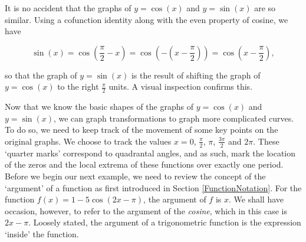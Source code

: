 \medskip

It is no accident that the graphs of $y = \cos(x)$ and $y = \sin(x)$ are so similar.  Using a cofunction identity along with the even property of cosine, we have

\[ \sin(x) = \cos\left(\frac{\pi}{2} - x\right) = \cos\left(-\left(x - \frac{\pi}{2}\right)\right) = \cos\left(x - \frac{\pi}{2}\right),\]

so that the graph of $y=\sin(x)$ is the result of shifting the graph of $y = \cos(x)$ to the right $\frac{\pi}{2}$ units.  A visual inspection confirms this. 

\smallskip

Now that we know the basic shapes of the graphs of $y = \cos(x)$ and $y = \sin(x)$, we can graph transformations to graph more complicated curves.  To do so, we need to keep track of the movement of some key points on the original graphs. We choose to track the values $x = 0$, $\frac{\pi}{2}$, $\pi$, $\frac{3\pi}{2}$ and $2\pi$.  These `quarter marks' correspond to quadrantal angles, and as such, mark the location of the zeros and the local extrema of these functions over exactly one period.  Before we begin our next example, we need to review the concept of the `argument' of a function as first introduced in Section \ref{FunctionNotation}.  For the function $f(x) = 1 - 5\cos(2x-\pi)$, the argument of $f$ is $x$.  We shall have occasion, however, to refer to the argument of the \textit{cosine}, which in this case is $2x-\pi$.  Loosely stated, the argument of a trigonometric function is the expression `inside' the function.

\medskip

